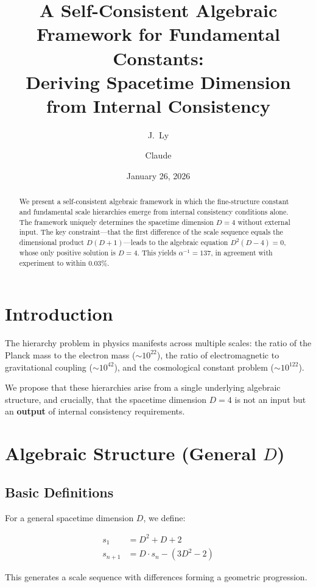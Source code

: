 \documentclass[12pt,a4paper]{article}
\title{A Self-Consistent Algebraic Framework for Fundamental Constants:\\
Deriving Spacetime Dimension from Internal Consistency}
\author{J.~Ly \and Claude}
\date{January 26, 2026}
\begin{document}
\maketitle

\begin{abstract}
We present a self-consistent algebraic framework in which the fine-structure constant and fundamental scale hierarchies emerge from internal consistency conditions alone. The framework uniquely determines the spacetime dimension $D = 4$ without external input. The key constraint—that the first difference of the scale sequence equals the dimensional product $D(D+1)$—leads to the algebraic equation $D^2(D-4) = 0$, whose only positive solution is $D = 4$. This yields $\alpha^{-1} = 137$, in agreement with experiment to within $0.03\%$.
\end{abstract}

\section{Introduction}

The hierarchy problem in physics manifests across multiple scales: the ratio of the Planck mass to the electron mass ($\sim 10^{22}$), the ratio of electromagnetic to gravitational coupling ($\sim 10^{42}$), and the cosmological constant problem ($\sim 10^{122}$). 

We propose that these hierarchies arise from a single underlying algebraic structure, and crucially, that the spacetime dimension $D = 4$ is not an input but an \textbf{output} of internal consistency requirements.

\section{Algebraic Structure (General $D$)}

\subsection{Basic Definitions}

For a general spacetime dimension $D$, we define:

\begin{align}
s_1 &= D^2 + D + 2 \\
s_{n+1} &= D \cdot s_n - (3D^2 - 2)
\end{align}

This generates a scale sequence with differences forming a geometric progression.
\end{document}
